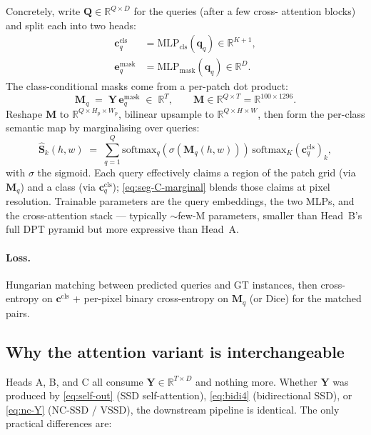 \documentclass[11pt,a4paper]{article}
\begin{document}
Concretely, write
$\bm{Q}\in\mathbb{R}^{Q\times D}$ for the queries (after a few cross-
attention blocks) and split each into two heads:
\begin{align}
  \bm{c}_q^{\text{cls}} &= \mathrm{MLP}_{\text{cls}}(\bm{q}_q)\in\mathbb{R}^{K+1}, \\
  \bm{e}_q^{\text{mask}} &= \mathrm{MLP}_{\text{mask}}(\bm{q}_q)\in\mathbb{R}^{D}.
\end{align}
The class-conditional masks come from a per-patch dot product:
\begin{equation}
  \bm{M}_q \;=\; \bm{Y}\,\bm{e}_q^{\text{mask}}
   \;\in\;\mathbb{R}^{T},
  \qquad
  \bm{M}\in\mathbb{R}^{Q\times T}=\mathbb{R}^{100\times 1296}.
\end{equation}
Reshape $\bm{M}$ to $\mathbb{R}^{Q\times H_p\times W_p}$, bilinear
upsample to $\mathbb{R}^{Q\times H\times W}$, then form the per-class
semantic map by marginalising over queries:
\begin{equation}\label{eq:seg-C-marginal}
  \widehat{\bm{S}}_k(h,w)
   \;=\; \sum_{q=1}^{Q}
         \mathrm{softmax}_q(\sigma(\bm{M}_q(h,w)))\,
         \mathrm{softmax}_K(\bm{c}_q^{\text{cls}})_k,
\end{equation}
with $\sigma$ the sigmoid. Each query effectively claims a region of
the patch grid (via $\bm{M}_q$) and a class (via $\bm{c}_q^{\text{cls}}$);
\eqref{eq:seg-C-marginal} blends those claims at pixel resolution.
Trainable parameters are the query embeddings, the two MLPs, and
the cross-attention stack — typically $\sim$few-M parameters, smaller
than Head~B's full DPT pyramid but more expressive than Head~A.

\paragraph{Loss.} Hungarian matching between predicted queries and GT
instances, then cross-entropy on $\bm{c}^{\text{cls}}$ + per-pixel
binary cross-entropy on $\bm{M}_q$ (or Dice) for the matched pairs.

\subsection{Why the attention variant is interchangeable}

Heads A, B, and C all consume $\bm{Y}\in\mathbb{R}^{T\times D}$ and
nothing more. Whether $\bm{Y}$ was produced by
\eqref{eq:self-out} (SSD self-attention), \eqref{eq:bidi4}
(bidirectional SSD), or \eqref{eq:nc-Y} (NC-SSD / VSSD), the
downstream pipeline is identical. The only practical differences are:
\end{document}
